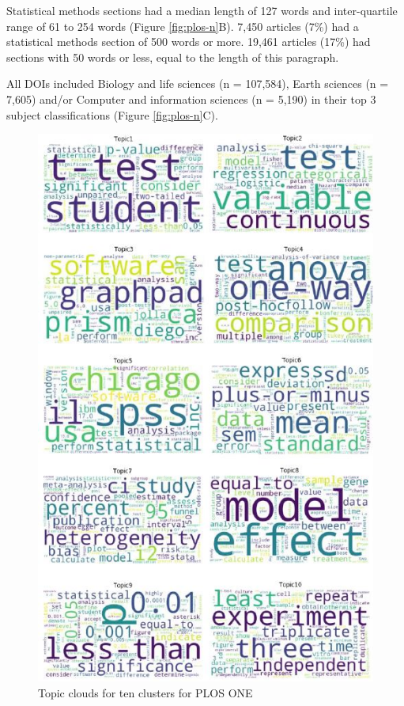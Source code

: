 \documentclass[12pt]{article}
\begin{document}
Statistical methods sections had a median length of 127 words and
inter-quartile range of 61 to 254 words (Figure \ref{fig:plos-n}B).
7,450 articles (7\%) had a statistical methods section of 500 words or
more. 19,461 articles (17\%) had sections with 50 words or less, equal
to the length of this paragraph.

All DOIs included Biology and life sciences (n = 107,584), Earth
sciences (n = 7,605) and/or Computer and information sciences (n =
5,190) in their top 3 subject classifications (Figure
\ref{fig:plos-n}C).

\begin{figure}

{\centering \includegraphics[width=0.8\linewidth]{figures/plos.wordclouds} 

}

\caption{\label{fig:plos-clouds}Topic clouds for ten clusters for PLOS ONE}\label{fig:unnamed-chunk-5}
\end{figure}
\end{document}
